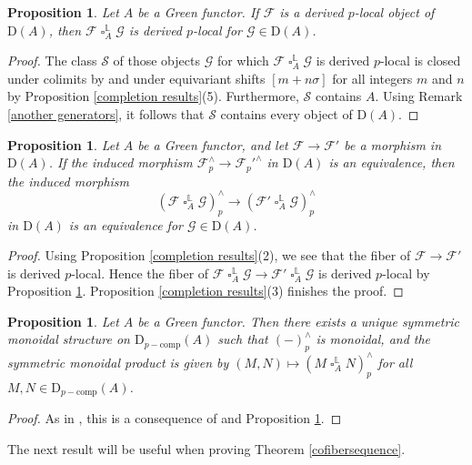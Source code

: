 \documentclass[10pt]{amsart}
\newtheorem{prop}[thm]{Proposition}
\theoremstyle{definition}
\numberwithin{equation}{section}
\renewcommand{\L}{\mathbb{L}}
\newcommand{\cF}{\mathcal{F}}
\newcommand{\cG}{\mathcal{G}}
\newcommand{\cS}{\mathcal{S}}
\newcommand{\rD}{\mathrm{D}}
\newcommand{\comp}{\mathrm{comp}}
\DeclareMathOperator{\sotimes}{\square}
\begin{document}
\begin{prop}
\label{locality and monoidal}
Let $A$ be a Green functor.
If $\cF$ is a derived $p$-local object of $\rD(A)$,
then $\cF\sotimes_{A}^\L \cG$ is derived $p$-local for $\cG\in \rD(A)$.
\end{prop}
\begin{proof}
The class $\cS$ of those objects $\cG$ for which $\cF\sotimes_{A}^\L \cG$ is
derived $p$-local is closed under colimits by \cite[Proposition 7.2.4.9(2)]{SAG} and under equivariant shifts
$[m+n\sigma]$ for all integers $m$ and $n$ by Proposition \ref{completion results}(5).
Furthermore,
$\cS$ contains $A$.
Using Remark \ref{another generators}, it follows that $\cS$ contains every object of $\rD(A)$.
\end{proof}



\begin{prop}
\label{monoidal completion local}
Let $A$ be a Green functor,
and let $\cF\to \cF'$ be a morphism in $\rD(A)$.
If the induced morphism $\cF_p^\wedge \to \cF_p'^\wedge$ in $\rD(A)$ is an equivalence,
then the induced morphism
\[
(\cF\sotimes_{A}^\L \cG)_p^\wedge
\to
(\cF'\sotimes_{A}^\L \cG)_p^\wedge
\]
in $\rD(A)$ is an equivalence for $\cG\in \rD(A)$.
\end{prop}
\begin{proof}
Using Proposition \ref{completion results}(2), we see that the fiber of $\cF\to \cF'$ is derived $p$-local.
Hence the fiber of
\(
\cF\sotimes_{A}^\L \cG
\to
\cF'\sotimes_{A}^\L \cG
\)
is derived $p$-local by Proposition \ref{locality and monoidal}.
Proposition \ref{completion results}(3) finishes the proof.
\end{proof}


\begin{prop}
Let $A$ be a Green functor.
Then there exists a unique 
symmetric monoidal structure on $\rD_{p-\comp}(A)$ such that $(-)_p^\wedge$ is monoidal,
and the symmetric monoidal product is given by $(M,N)\mapsto (M\sotimes_A^\L N)_p^\wedge$ for all $M,N\in \rD_{p-\comp}(A)$.
\end{prop}
\begin{proof}
As in \cite[Corollary 7.3.5.2]{SAG},
this is a consequence of \cite[Proposition 2.2.1.9]{HA} and Proposition \ref{monoidal completion local}.
\end{proof}
The next result will be useful when proving Theorem \ref{cofibersequence}.
\end{document}
